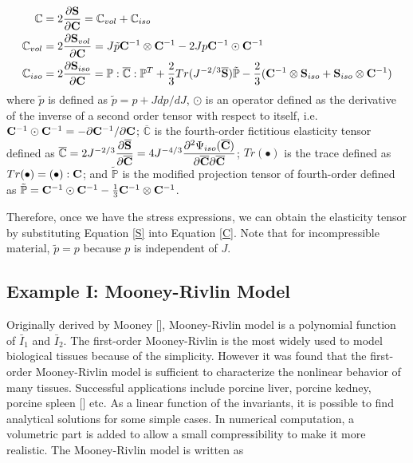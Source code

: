 \begin{subequations} 
\label{C}
\begin{align}
\mathbb{C} &= 2\frac{\partial{\bold{S}}}{\partial{\bold{C}}} = \mathbb{C}_{vol} + \mathbb{C}_{iso} 
\label{Ctotal} \\
\mathbb{C}_{vol} &= 2\frac{\partial{\bold{S}_{vol}}}{\partial{\bold{C}}} = 
J\tilde{p}\bold{C}^{-1}\otimes\bold{C}^{-1} - 2Jp\bold{C}^{-1}\odot\bold{C}^{-1} \label{Cvol} \\
\mathbb{C}_{iso} &= 2\frac{\partial{\bold{S}_{iso}}}{\partial{\bold{C}}} =
\mathbb{P} : \overline{\mathbb{C}} : \mathbb{P}^T + \frac{2}{3}Tr(J^{-2/3}\overline{\bold{S}})\tilde{\mathbb{P}} - \frac{2}{3}(\bold{C}^{-1}\otimes\bold{S}_{iso} + \bold{S}_{iso}\otimes \bold{C}^{-1})
\label{Ciso} 
\end{align}
\end{subequations}
where $\tilde{p}$ is defined as $\tilde{p} = p + J{dp}/{dJ}$, $\odot$ is an operator defined as the derivative of the inverse of a second order tensor with respect to itself, i.e. 
$\bold{C}^{-1}\odot\bold{C}^{-1} = - {\partial{\bold{C}^{-1}}} / {\partial{\bold{C}}}$; 
$\overline{\mathbb{C}}$ is the fourth-order fictitious elasticity tensor defined as 
$\overline{\mathbb{C}} = 2J^{-2/3}\dfrac{\partial{\overline{\bold{S}}}}{\partial{\overline{\bold{C}}}} = 4J^{-4/3} \dfrac{\partial^2\Psi_{iso}(\overline{\bold{C}})} {\partial{\overline{\bold{C}}}{\partial{\overline{\bold{C}}}}} $;
$Tr(\bullet)$ is the trace defined as $Tr(\bullet) = (\bullet) : \bold{C}$;
and $\tilde{\mathbb{P}}$ is the modified projection tensor of fourth-order defined as 
$\tilde{\mathbb{P}} = \bold{C}^{-1} \odot \bold{C}^{-1} -  \frac{1}{3}\bold{C}^{-1} \otimes \bold{C}^{-1}$.

Therefore, once we have the stress expressions, we can obtain the elasticity tensor by substituting Equation \ref{S} into Equation \ref{C}. Note that for incompressible material, $\tilde{p} = p$ because $p$ is independent of $J$.

%
\subsection{Example I: Mooney-Rivlin Model}
Originally derived by Mooney [], Mooney-Rivlin model is a polynomial function of $\bar{I}_1$ and $\bar{I}_2$. The first-order Mooney-Rivlin is the most widely used to model biological tissues because of the simplicity. However it was found that the first-order Mooney-Rivlin model is sufficient to characterize the nonlinear behavior of many tissues. Successful applications include porcine liver, porcine kedney, porcine spleen [] etc. As a linear function of the invariants, it is possible to find analytical solutions for some simple cases. In numerical computation, a volumetric part is added to allow a small compressibility to make it more realistic. The Mooney-Rivlin model is written as

